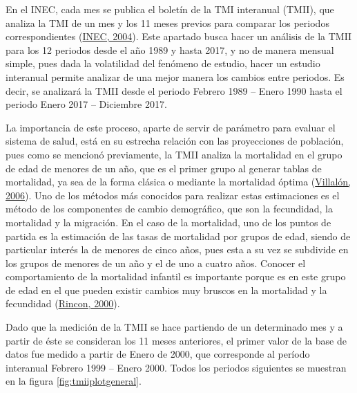 \documentclass[
]{article}
\begin{document}
En el INEC, cada mes se publica el boletín de la TMI interanual (TMII),
que analiza la TMI de un mes y los 11 meses previos para comparar los
periodos correspondientes (\protect\hyperlink{ref-infantiles}{INEC,
2004}). Este apartado busca hacer un análisis de la TMII para los 12
periodos desde el año 1989 y hasta 2017, y no de manera mensual simple,
pues dada la volatilidad del fenómeno de estudio, hacer un estudio
interanual permite analizar de una mejor manera los cambios entre
periodos. Es decir, se analizará la TMII desde el periodo Febrero 1989
-- Enero 1990 hasta el periodo Enero 2017 -- Diciembre 2017.

La importancia de este proceso, aparte de servir de parámetro para
evaluar el sistema de salud, está en su estrecha relación con las
proyecciones de población, pues como se mencionó previamente, la TMII
analiza la mortalidad en el grupo de edad de menores de un año, que es
el primer grupo al generar tablas de mortalidad, ya sea de la forma
clásica o mediante la mortalidad óptima
(\protect\hyperlink{ref-mortalidad_optima}{Villalón, 2006}). Uno de los
métodos más conocidos para realizar estas estimaciones es el método de
los componentes de cambio demográfico, que son la fecundidad, la
mortalidad y la migración. En el caso de la mortalidad, uno de los
puntos de partida es la estimación de las tasas de mortalidad por grupos
de edad, siendo de particular interés la de menores de cinco años, pues
esta a su vez se subdivide en los grupos de menores de un año y el de
uno a cuatro años. Conocer el comportamiento de la mortalidad infantil
es importante porque es en este grupo de edad en el que pueden existir
cambios muy bruscos en la mortalidad y la fecundidad
(\protect\hyperlink{ref-Rincon}{Rincon, 2000}).

Dado que la medición de la TMII se hace partiendo de un determinado mes
y a partir de éste se consideran los 11 meses anteriores, el primer
valor de la base de datos fue medido a partir de Enero de 2000, que
corresponde al período interanual Febrero 1999 -- Enero 2000. Todos los
periodos siguientes se muestran en la figura \ref{fig:tmiiplotgeneral}.
\end{document}
